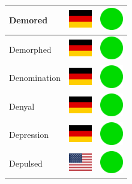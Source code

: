 \documentclass[12pt, a4paper, twoside]{report}
\begin{document}
\begin{center}
\begin{longtable}{|p{5cm}|p{2cm}|p{2cm}|}
 Demored                                                    & \includegraphics[width=1cm]{../4x3/de} &   \includegraphics[width=1cm]{../likes/y} \\ \hline
 Demorphed                                                  & \includegraphics[width=1cm]{../4x3/de} &   \includegraphics[width=1cm]{../likes/y} \\ \hline
 Denomination                                               & \includegraphics[width=1cm]{../4x3/de} &   \includegraphics[width=1cm]{../likes/y} \\ \hline
 Denyal                                                     & \includegraphics[width=1cm]{../4x3/de} &   \includegraphics[width=1cm]{../likes/y} \\ \hline
 Depression                                                 & \includegraphics[width=1cm]{../4x3/de} &   \includegraphics[width=1cm]{../likes/y} \\ \hline
 Depulsed                                                   & \includegraphics[width=1cm]{../4x3/us} &   \includegraphics[width=1cm]{../likes/y} \\ \hline

\end{longtable}
\end{center}
\end{document}
